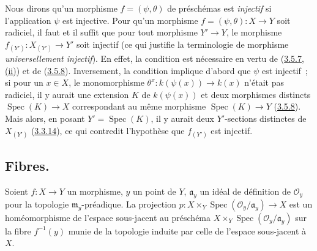 \begin{remark}[3.5.11]
\label{I.3.5.11-fr}
Nous dirons qu'un morphisme $f=(\psi,\theta)$ de préschémas est
\emph{injectif} si l'application $\psi$ est injective. Pour qu'un morphisme
$f=(\psi,\theta):X\to Y$ soit radiciel, il faut et il suffit que pour tout
morphisme $Y'\to Y$, le morphisme $f_{(Y')}:X_{(Y')}\to Y'$ soit injectif (ce
qui justifie la terminologie de morphisme \emph{universellement injectif}). En
effet, la condition est nécessaire en vertu de
(\hyperref[I.3.5.7-fr]{3.5.7, (ii)}) et de
(\hyperref[I.3.5.8-fr]{3.5.8}). Inversement, la condition implique d'abord que
$\psi$ est injectif~; si pour un $x\in X$, le monomorphisme
$\theta^x:k(\psi(x))\to k(x)$ n'était pas radiciel, il y aurait une extension
$K$ de $k(\psi(x))$ et deux morphismes distincts
$\operatorname{Spec}(K)\to X$ correspondant au même morphisme
$\operatorname{Spec}(K)\to Y$ (\hyperref[I.3.5.8-fr]{3.5.8}). Mais alors, en
posant $Y'=\operatorname{Spec}(K)$, il y aurait deux $Y'$-sections distinctes
de $X_{(Y')}$ (\hyperref[I.3.3.14-fr]{3.3.14}), ce qui contredit l'hypothèse
que $f_{(Y')}$ est injectif.
\end{remark}

\subsection{Fibres.}
\label{subsection:I.3.6-fr}

\begin{proposition}[3.6.1]
\label{I.3.6.1-fr}
Soient $f:X\to Y$ un morphisme, $y$ un point de $Y$, $\mathfrak{a}_y$ un
idéal de définition de $\mathcal{O}_y$ pour la topologie
$\mathfrak{m}_y$-préadique. La projection
$p:X\times_Y\operatorname{Spec}(\mathcal{O}_y/\mathfrak{a}_y)\to X$ est un
homéomorphisme de l'espace sous-jacent au préschéma
$X\times_Y\operatorname{Spec}(\mathcal{O}_y/\mathfrak{a}_y)$ sur la fibre
$f^{-1}(y)$ munie de la topologie induite par celle de l'espace sous-jacent à
$X$.
\end{proposition}

